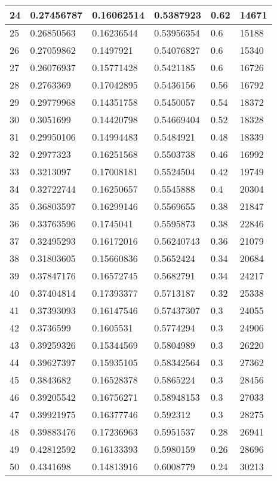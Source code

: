 \begin{longtable}{|l|l|l|l|l|l|}
24 & 0.27456787 & 0.16062514 & 0.5387923 & 0.62 & 14671 \\ \hline 
25 & 0.26850563 & 0.16236544 & 0.53956354 & 0.6 & 15188 \\ \hline 
26 & 0.27059862 & 0.1497921 & 0.54076827 & 0.6 & 15340 \\ \hline 
27 & 0.26076937 & 0.15771428 & 0.5421185 & 0.6 & 16726 \\ \hline 
28 & 0.2763369 & 0.17042895 & 0.5436156 & 0.56 & 16792 \\ \hline 
29 & 0.29779968 & 0.14351758 & 0.5450057 & 0.54 & 18372 \\ \hline 
30 & 0.3051699 & 0.14420798 & 0.54669404 & 0.52 & 18328 \\ \hline 
31 & 0.29950106 & 0.14994483 & 0.5484921 & 0.48 & 18339 \\ \hline 
32 & 0.2977323 & 0.16251568 & 0.5503738 & 0.46 & 16992 \\ \hline 
33 & 0.3213097 & 0.17008181 & 0.5524504 & 0.42 & 19749 \\ \hline 
34 & 0.32722744 & 0.16250657 & 0.5545888 & 0.4 & 20304 \\ \hline 
35 & 0.36803597 & 0.16299146 & 0.5569655 & 0.38 & 21847 \\ \hline 
36 & 0.33763596 & 0.1745041 & 0.5595873 & 0.38 & 22846 \\ \hline 
37 & 0.32495293 & 0.16172016 & 0.56240743 & 0.36 & 21079 \\ \hline 
38 & 0.31803605 & 0.15660836 & 0.5652424 & 0.34 & 20684 \\ \hline 
39 & 0.37847176 & 0.16572745 & 0.5682791 & 0.34 & 24217 \\ \hline 
40 & 0.37404814 & 0.17393377 & 0.5713187 & 0.32 & 25338 \\ \hline 
41 & 0.37393093 & 0.16147546 & 0.57437307 & 0.3 & 24055 \\ \hline 
42 & 0.3736599 & 0.1605531 & 0.5774294 & 0.3 & 24906 \\ \hline 
43 & 0.39259326 & 0.15344569 & 0.5804989 & 0.3 & 26220 \\ \hline 
44 & 0.39627397 & 0.15935105 & 0.58342564 & 0.3 & 27362 \\ \hline 
45 & 0.3843682 & 0.16528378 & 0.5865224 & 0.3 & 28456 \\ \hline 
46 & 0.39205542 & 0.16756271 & 0.58948153 & 0.3 & 27033 \\ \hline 
47 & 0.39921975 & 0.16377746 & 0.592312 & 0.3 & 28275 \\ \hline 
48 & 0.39883476 & 0.17236963 & 0.5951537 & 0.28 & 26941 \\ \hline 
49 & 0.42812592 & 0.16133393 & 0.5980159 & 0.26 & 28696 \\ \hline 
50 & 0.4341698 & 0.14813916 & 0.6008779 & 0.24 & 30213 \\ \hline 
\end{longtable}